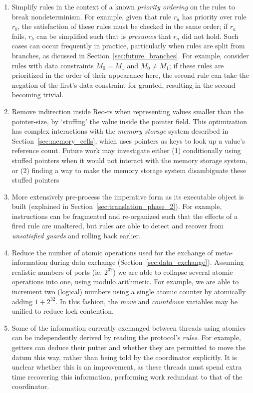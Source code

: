 \begin{enumerate}
	\item Simplify rules in the context of a known \textit{priority ordering} on the rules to break nondeterminism. For example, given that rule $r_a$ has priority over rule $r_b$, the satisfaction of these rules must be checked in the same order; if $r_a$ fails, $r_b$ can be simplified such that is \textit{presumes} that $r_a$ did not hold. Such cases can occur frequently in practice, particularly when rules are split from branches, as dicussed in Section~\ref{sec:future_branches}. For example, consider rules  with data constraints $M_0=M_1$ and $M_0\neq{}M_1$; if these rules are prioritized in the order of their appearance here, the second rule can take the negation of the first's data constraint for granted, resulting in the second becoming trivial.
	
	\item Remove indirection inside Reo-rs when representing values smaller than the pointer-size, by `stuffing' the value inside the pointer field. This optimization has complex interactions with the \textit{memory storage} system described in Section~\ref{sec:memory_cells}, which uses pointers as keys to look up a value's reference count. Future work may investigate either (1) conditionally using stuffed pointers when it would not interact with the memory storage system, or (2) finding a way to make the memory storage system disambiguate these stuffed pointers
	
	
	\item More extensively pre-process the imperative form as its executable object is built (explained in Section~\ref{sec:translation_phase_2}). For example, instructions can be fragmented and re-organized such that the effects of a fired rule are unaltered, but rules are able to detect and recover from \textit{unsatisfied guards} and rolling back earlier.	
	
	\item Reduce the number of atomic operations used for the exchange of meta-information during data exchange (Section~\ref{sec:data_exchange}). Assuming realistic numbers of ports (ie. $2^{32}$) we are able to collapse several atomic operations into one, using modulo arithmetic. For example, we are able to increment two (logical) numbers using a single atomic counter by atomically adding $1 + 2^32$. In this fashion, the \textit{move} and \textit{countdown} variables may be unified to reduce lock contention.
	
	\item Some of the information currently exchanged between threads using atomics can be independently derived by reading the protocol's \textit{rules}. For example, getters can deduce their putter and whether they are permitted to move the datum this way, rather than being told by the coordinator explicitly. It is unclear whether this is an improvement, as these threads must spend extra time recovering this information, performing work redundant to that of the coordinator. 
\end{enumerate}
